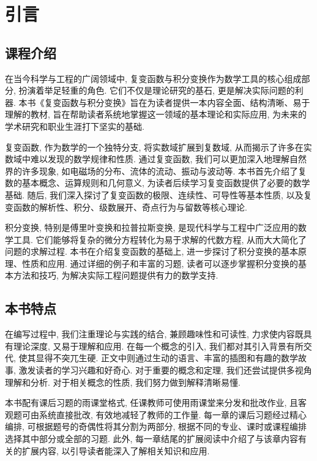 
\chapter*{引\qquad 言}

\section*{课程介绍}
在当今科学与工程的广阔领域中, 复变函数与积分变换作为数学工具的核心组成部分, 扮演着举足轻重的角色. 它们不仅是理论研究的基石, 更是解决实际问题的利器. 本书《复变函数与积分变换》旨在为读者提供一本内容全面、结构清晰、易于理解的教材, 旨在帮助读者系统地掌握这一领域的基本理论和实际应用, 为未来的学术研究和职业生涯打下坚实的基础. 

复变函数, 作为数学的一个独特分支, 将实数域扩展到复数域, 从而揭示了许多在实数域中难以发现的数学规律和性质. 通过复变函数, 我们可以更加深入地理解自然界的许多现象, 如电磁场的分布、流体的流动、振动与波动等. 本书首先介绍了复数的基本概念、运算规则和几何意义, 为读者后续学习复变函数提供了必要的数学基础. 随后, 我们深入探讨了复变函数的极限、连续性、可导性等基本性质, 以及复变函数的解析性、积分、级数展开、奇点行为与留数等核心理论. 

积分变换, 特别是傅里叶变换和拉普拉斯变换, 是现代科学与工程中广泛应用的数学工具. 它们能够将复杂的微分方程转化为易于求解的代数方程, 从而大大简化了问题的求解过程. 本书在介绍复变函数的基础上, 进一步探讨了积分变换的基本原理、性质和应用. 通过详细的例子和丰富的习题, 读者可以逐步掌握积分变换的基本方法和技巧, 为解决实际工程问题提供有力的数学支持. 

\section*{本书特点}
在编写过程中, 我们注重理论与实践的结合, 兼顾趣味性和可读性, 力求使内容既具有理论深度, 又易于理解和应用.
在每一个概念的引入, 我们都对其引入背景有所交代, 使其显得不突兀生硬.
正文中则通过生动的语言、丰富的插图和有趣的数学故事, 激发读者的学习兴趣和好奇心.
对于重要的概念和定理, 我们还尝试提供多视角理解和分析.
对于相关概念的性质, 我们努力做到解释清晰易懂.

本书配有课后习题的雨课堂格式, 任课教师可使用雨课堂来分发和批改作业, 且客观题可由系统直接批改, 有效地减轻了教师的工作量.
每一章的课后习题经过精心编排, 可根据题号的奇偶性将其分割为两部分, 根据不同的专业、课时或课程编排选择其中部分或全部的习题.
此外, 每一章结尾的扩展阅读中介绍了与该章内容有关的扩展内容, 以引导读者能深入了解相关知识和应用.

